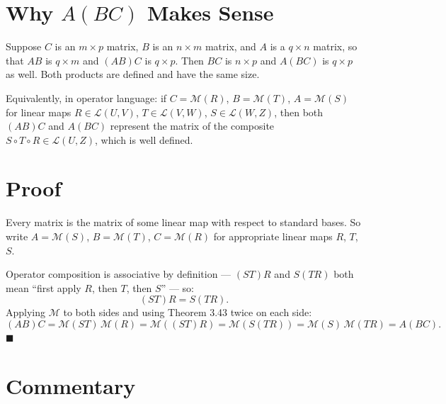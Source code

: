 \documentclass[12pt]{article}
\theoremstyle{remark}
\newcommand{\M}[1]{\mathcal{M}\!\left(#1\right)}
\newcommand{\Lc}{\mathcal{L}}
\begin{document}
\section*{Why $A(BC)$ Makes Sense}
 
Suppose $C$ is an $m \times p$ matrix, $B$ is an $n \times m$ matrix, and $A$
is a $q \times n$ matrix, so that $AB$ is $q \times m$ and $(AB)C$ is
$q \times p$. Then $BC$ is $n \times p$ and $A(BC)$ is $q \times p$ as well.
Both products are defined and have the same size.
 
Equivalently, in operator language: if $C = \M{R}$, $B = \M{T}$, $A = \M{S}$
for linear maps $R \in \Lc(U, V)$, $T \in \Lc(V, W)$, $S \in \Lc(W, Z)$, then
both $(AB)C$ and $A(BC)$ represent the matrix of the composite
$S \circ T \circ R \in \Lc(U, Z)$, which is well defined.
 
\section*{Proof}
 
Every matrix is the matrix of some linear map with respect to standard bases.
So write $A = \M{S}$, $B = \M{T}$, $C = \M{R}$ for appropriate linear maps
$R$, $T$, $S$.
 
Operator composition is associative by definition --- $(ST)R$ and $S(TR)$ both
mean ``first apply $R$, then $T$, then $S$'' --- so:
\[
    (ST)R = S(TR).
\]
Applying $\mathcal{M}$ to both sides and using Theorem 3.43 twice on each side:
\[
    (AB)C = \M{ST}\,\M{R} = \M{(ST)R} = \M{S(TR)} = \M{S}\,\M{TR} = A(BC).
\]
\hfill$\blacksquare$
 
\section*{Commentary}
 
\end{document}
